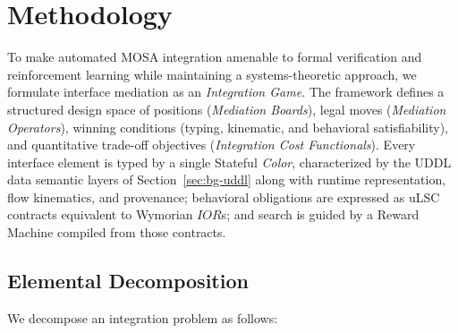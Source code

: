 \section{Methodology} \label{sec:methodology}

To make automated MOSA integration amenable to formal verification and reinforcement learning while maintaining a systems-theoretic approach, we formulate interface mediation as an \emph{Integration Game}.  The framework defines a structured design space of positions (\emph{Mediation Boards}), legal moves (\emph{Mediation Operators}), winning conditions (typing, kinematic, and behavioral satisfiability), and quantitative trade-off objectives (\emph{Integration Cost Functionals}).  Every interface element is typed by a single Stateful \emph{Color}, characterized by the UDDL data semantic layers of Section~\ref{sec:bg-uddl} along with runtime representation, flow kinematics, and provenance; behavioral obligations are expressed as uLSC contracts equivalent to Wymorian $IOR$s; and search is guided by a Reward Machine compiled from those contracts.

\subsection{Elemental Decomposition} \label{sec:meth-isomorphism}

We decompose an integration problem as follows:

